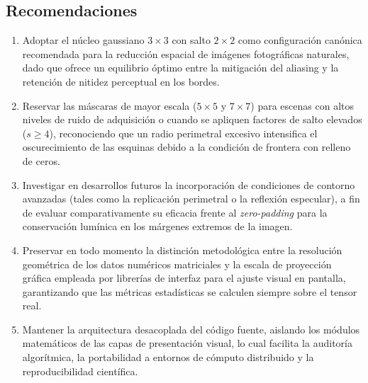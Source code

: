 \documentclass[11pt]{article}
\begin{document}
\subsection{Recomendaciones}
\begin{enumerate}[itemsep=0.3em]
\item Adoptar el núcleo gaussiano $3\times3$ con salto $2\times2$ como configuración canónica recomendada para la reducción espacial de imágenes fotográficas naturales, dado que ofrece un equilibrio óptimo entre la mitigación del aliasing y la retención de nitidez perceptual en los bordes.
\item Reservar las máscaras de mayor escala ($5\times5$ y $7\times7$) para escenas con altos niveles de ruido de adquisición o cuando se apliquen factores de salto elevados ($s \ge 4$), reconociendo que un radio perimetral excesivo intensifica el oscurecimiento de las esquinas debido a la condición de frontera con relleno de ceros.
\item Investigar en desarrollos futuros la incorporación de condiciones de contorno avanzadas (tales como la replicación perimetral o la reflexión especular), a fin de evaluar comparativamente su eficacia frente al \textit{zero-padding} para la conservación lumínica en los márgenes extremos de la imagen.
\item Preservar en todo momento la distinción metodológica entre la resolución geométrica de los datos numéricos matriciales y la escala de proyección gráfica empleada por librerías de interfaz para el ajuste visual en pantalla, garantizando que las métricas estadísticas se calculen siempre sobre el tensor real.
\item Mantener la arquitectura desacoplada del código fuente, aislando los módulos matemáticos de las capas de presentación visual, lo cual facilita la auditoría algorítmica, la portabilidad a entornos de cómputo distribuido y la reproducibilidad científica.
\end{enumerate}
\end{document}
